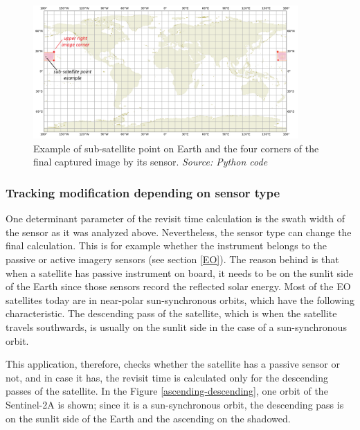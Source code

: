 \begin{figure}
\centering
\includegraphics[width=0.9\textwidth]{Images/correct_calculation.png}\caption{Example of sub-satellite point on Earth and the four corners of the final captured image by its sensor. \textit{Source: Python code}}
\label{correct_calculation}
\end{figure}

\bigskip
\subsubsection{Tracking modification depending on sensor type}
\bigskip

One determinant parameter of the revisit time calculation is the swath width of the sensor as it was analyzed above. Nevertheless, the sensor type can change the final calculation. This is for example whether the instrument belongs to the passive or active imagery sensors (see section \ref{EO}). The reason behind is that when a satellite has passive instrument on board, it needs to be on the sunlit side of the Earth since those sensors record the reflected solar energy. Most of the EO satellites today are in near-polar sun-synchronous orbits, which have the following characteristic. \cite{Kramer 2002} The descending pass of the satellite, which is when the satellite travels southwards, is usually on the sunlit side in the case of a sun-synchronous orbit.

This application, therefore, checks whether the satellite has a passive sensor or not, and in case it has, the revisit time is calculated only for the descending passes of the satellite. In the Figure \ref{ascending-descending}, one orbit of the Sentinel-2A is shown; since it is a sun-synchronous orbit, the descending pass is on the sunlit side of the Earth and the ascending on the shadowed.


